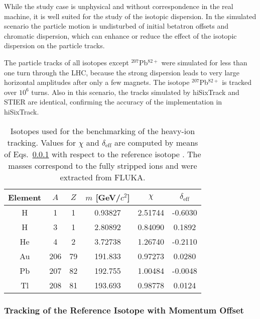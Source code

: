 While the study case is unphysical and without correspondence in the real machine, it is well suited for the study of the isotopic dispersion. In the simulated scenario the particle motion is undisturbed of initial betatron offsets and chromatic dispersion, which can enhance or reduce the effect of the isotopic dispersion on the particle tracks.

The particle tracks of all isotopes except $^{207}$Pb$^{82+}$ were simulated for less than one turn through the LHC, because the strong dispersion leads to very large horizontal amplitudes after only a few magnets. The isotope $^{207}$Pb$^{82+}$ is tracked over $10^6$ turns. Also in this scenario, the tracks simulated by hiSixTrack and STIER are identical, confirming the accuracy of the implementation in hiSixTrack. 


\begin{table}[b]
\centering
\caption{Isotopes used for the benchmarking of the heavy-ion tracking. Values for $\chi$ and $\delta_\text{eff}$ are computed by means of Eqs.~\ref{} with respect to the reference isotope \lead. The masses correspond to the fully stripped ions and were extracted from FLUKA.}
\label{tab:15080501}
\begin{tabular}{cccccc}
\toprule
Element & $A$ & $Z$ & $m$ [GeV/$c^2$] & $\chi$   & $\delta_\text{eff}$ \\ \midrule
H       & \phantom{12}1   & \phantom{1}1   & 0.93827         & 2.51744  & -0.6030              \\
H       & \phantom{12}3   & \phantom{1}1   & 2.80892      & 0.84090  & \phantom{-}0.1892              \\
He      & \phantom{12}4   & \phantom{1}2   & 3.72738         & 1.26740  & -0.2110              \\
Au      & 206 & 79  & 191.833      & 0.97273  & \phantom{-}0.0280             \\
Pb      & 207 & 82  & 192.755      & 1.00484  & -0.0048             \\
Tl      & 208 & 81  & 193.693      & 0.98778 & \phantom{-}0.0124           \\ \bottomrule
\end{tabular}
\end{table}



\subsubsection{Tracking of the Reference Isotope with Momentum Offset}

